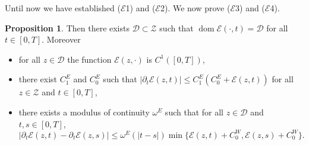 \documentclass[a4paper,10pt,twoside]{amsbook}
\numberwithin{section}{chapter}
\numberwithin{equation}{chapter}
\theoremstyle{definition}
\newtheorem{prop}{Proposition}[chapter]
\DeclareMathOperator{\dom}{dom}
\begin{document}
Until now we have established ($\mathcal{E}$1) and ($\mathcal{E}$2). We now prove ($\mathcal{E}$3) and ($\mathcal{E}$4).
\begin{prop}
\label{prop:power-control-necking}
Then there exists $\mathscr{D}\subset\mathscr{Z}$ such that $\dom\mathcal{E}(\cdot,t)=\mathscr{D}$ for all $t\in[0,T]$. Moreover
\begin{itemize}
\item[(i)] for all $z\in\mathscr{D}$ the function $\mathcal{E}(z,\cdot)$ is $C^1([0,T])$,
\item[(ii)] there exist $C_1^E$ and $C_0^E$ such that $|\partial_t\mathcal{E}(z,t)|\le C_1^E(C_0^E+\mathcal{E}(z,t))$ for all $z\in\mathscr{Z}$ and $t\in[0,T]$,
\item[(iii)] there exists a modulus of continuity $\omega^E$ such that for all $z\in\mathscr{D}$ and $t,s\in[0,T]$,
\[
|\partial_t\mathcal{E}(z,t)-\partial_t\mathcal{E}(z,s)|\le\omega^E(|t-s|)\min\{\mathcal{E}(z,t)+C_0^W,\mathcal{E}(z,s)+C_0^W\}.
\]
\end{itemize}
\end{prop}
\end{document}

